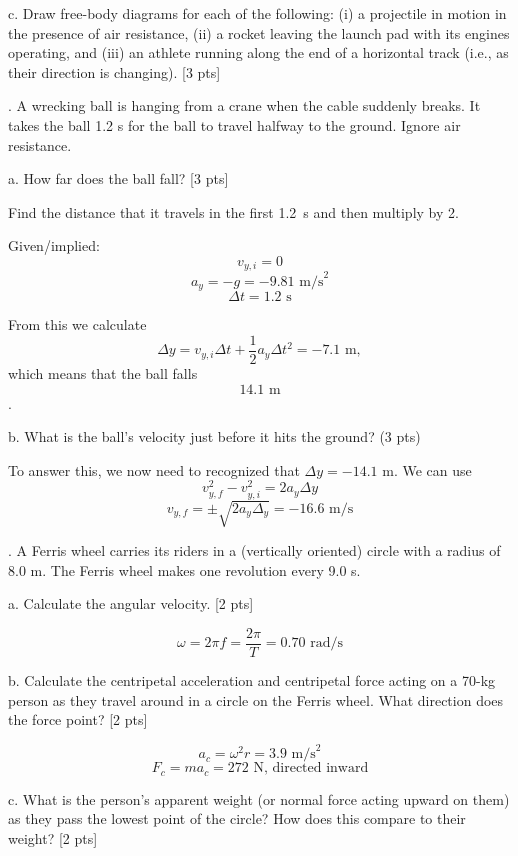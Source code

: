 \documentclass[11pt,letterpaper]{article}
\newcommand{\sol}[1]{{\color{NavyBlue} #1}}
\begin{document}
c. Draw free-body diagrams for each of the following: (i) a projectile in motion in the presence of air resistance, (ii) a rocket leaving the launch pad with its engines operating, and (iii) an athlete
running along the end of a horizontal track (i.e., as their direction is changing). [3 pts]



. A wrecking ball is hanging from a crane when the cable suddenly breaks. It takes the ball 1.2 s for the ball
to travel halfway to the ground. Ignore air resistance.

a. How far does the ball fall? [3 pts]

\sol{Find the distance that it travels in the first 1.2~s and then multiply by 2.

Given/implied:
$$v_{y,i}=0$$
$$a_y = -g = -9.81\mbox{ m/s}^2$$
$$\Delta t = 1.2\mbox{ s}$$

From this we calculate
$$\Delta y = v_{y,i}\Delta t + \frac{1}{2}a_y\Delta{t}^2=-7.1\mbox{ m},$$
which means that the ball falls $$\boxed{14.1\mbox{ m}}$$.
}
\vspace{2cm}

b. What is the ball’s velocity just before it hits the ground? (3 pts)

\sol{To answer this, we now need to recognized that $\Delta y=-14.1\mbox{ m}$. We can use
$$v_{y,f}^2 - v_{y,i}^2 = 2a_y\Delta y$$
$$v_{y,f} = \pm \sqrt{2a_y\Delta_y} = \boxed{-16.6\mbox{ m/s}}$$

}



. A Ferris wheel carries its riders in a (vertically oriented) circle with a radius of 8.0 m. The Ferris wheel makes one revolution every 9.0 s. 

a. Calculate the angular velocity. [2 pts]

\sol{$$\omega = 2\pi f = \frac{2\pi}{T} = \boxed{0.70\mbox{ rad/s}}$$}
\vspace{1cm}

b. Calculate the centripetal acceleration and centripetal force acting on a 70-kg person as they travel around in a circle on the Ferris wheel. What direction does the force point? [2 pts]

\sol{
$$a_c = \omega^2r = \boxed{3.9\mbox{ m/s}^2}$$
$$F_c = ma_c = \boxed{272\mbox{ N, directed inward}}$$}
\vspace{1cm}


c. What is the person's apparent weight (or normal force acting upward on them) as they pass the lowest point of the circle? How does this compare to their weight? [2 pts]
\end{document}
